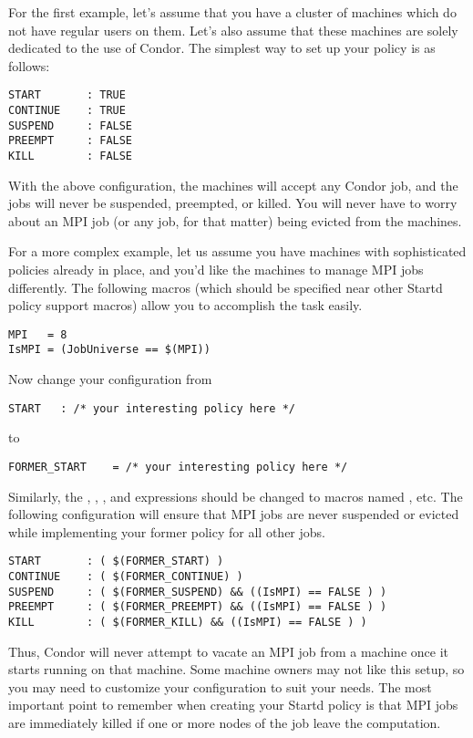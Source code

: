 For the first example, let's assume that you have a cluster of machines which
do not have regular users on them.  Let's also assume that these machines are 
solely dedicated to the use of Condor.  
The simplest way to set up your policy is as follows:
\begin{verbatim}
START       : TRUE
CONTINUE    : TRUE
SUSPEND     : FALSE
PREEMPT     : FALSE
KILL        : FALSE
\end{verbatim}

With the above configuration, the machines will accept any Condor job, and the
jobs will never be suspended, preempted, or killed.  You will never have to 
worry about an MPI job (or any job, for that matter) being evicted from the 
machines.

For a more complex example, let us assume you have machines with sophisticated 
policies already in place, and you'd like the machines to manage MPI jobs 
differently.  The following macros (which should be specified
near other Startd policy support macros) allow you to accomplish the task 
easily.
\begin{verbatim}
MPI	  = 8
IsMPI = (JobUniverse == $(MPI))
\end{verbatim}
Now change your configuration from
\begin{verbatim}
START	: /* your interesting policy here */
\end{verbatim}
to 
\begin{verbatim}
FORMER_START	= /* your interesting policy here */
\end{verbatim}
Similarly, the , , , and 
 expressions should be changed to macros named 
, etc.  The following configuration will ensure that
MPI jobs are never suspended or evicted while implementing your former policy
for all other jobs.
\begin{verbatim}
START		: ( $(FORMER_START) )
CONTINUE	: ( $(FORMER_CONTINUE) )
SUSPEND		: ( $(FORMER_SUSPEND) && ((IsMPI) == FALSE ) )
PREEMPT		: ( $(FORMER_PREEMPT) && ((IsMPI) == FALSE ) )
KILL		: ( $(FORMER_KILL) && ((IsMPI) == FALSE ) )
\end{verbatim}
Thus, Condor will never attempt to vacate an MPI job from a machine once 
it starts running on that machine.  
Some machine owners may not like this setup, so you may need to customize 
your configuration to suit your needs.  
The most important point to remember when creating your Startd policy is 
that MPI jobs are immediately killed if one or more nodes of the job leave
the computation.

